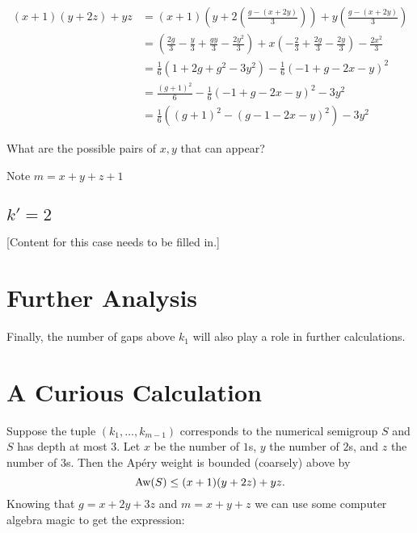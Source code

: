\documentclass[11pt]{article}
\begin{document}
\begin{align*}
    (x + 1)(y + 2z) + yz &= (x + 1)(y + 2(\frac{g - (x + 2y)}{3})) + y (\frac{g - (x + 2y)}{3}) \\
    &= \left(\frac{2g}{3}  - \frac{y}{3} + \frac{gy}{3} - \frac{2y^2}{3}\right) + x\left(-\frac{2}{3} + \frac{2g}{3} - \frac{2y}{3}\right)  - \frac{2x^2}{3} \\
    &= \frac{1}{6} \left(1 + 2g + g^2 - 3y^2\right) -\frac{1}{6} \left(-1 + g - 2x - y\right)^2 \\
    &= \frac{(g+1)^2}{6} -\frac{1}{6} \left(-1 + g - 2x - y\right)^2 - 3y^2 \\
    &= \frac{1}{6}\left( (g + 1)^2 - (g - 1 - 2x - y)^2\right) - 3y^2
\end{align*}

What are the possible pairs of \(x, y\) that can appear?

Note \(m = x + y + z + 1\)

\subsection{\(k' = 2\)}

[Content for this case needs to be filled in.]

\section{Further Analysis}

Finally, the number of gaps above \(k_1\) will also play a role in further calculations.

\section{A Curious Calculation}
Suppose the tuple \((k_1, \dots, k_{m-1})\) corresponds to the numerical semigroup \(S\) and \(S\) has depth at most \(3\). Let \(x\) be the number of \(1\)s, \(y\) the number of \(2\)s, and \(z\) the number of \(3\)s. Then the Ap\'ery weight is bounded (coarsely) above by \[
\text{Aw}(S) \le (x+1)(y+2z) + yz.
\] Knowing that \(g = x + 2y + 3z\) and \(m = x + y + z\) we can use some computer algebra magic to get the expression:




\newpage
\end{document}
